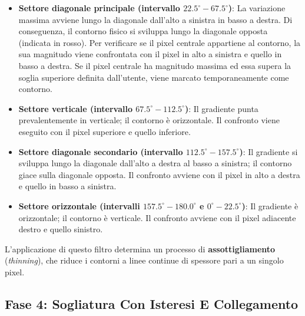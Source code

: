 ﻿\documentclass[11pt, a4paper]{article}
\begin{document}
\begin{itemize}
    \item \textbf{Settore diagonale principale (intervallo $22.5^\circ - 67.5^\circ$)}: La variazione massima avviene lungo la diagonale dall'alto a sinistra in basso a destra. Di conseguenza, il contorno fisico si sviluppa lungo la diagonale opposta (indicata in rosso). Per verificare se il pixel centrale appartiene al contorno, la sua magnitudo viene confrontata con il pixel in alto a sinistra e quello in basso a destra. Se il pixel centrale ha magnitudo massima ed essa supera la soglia superiore definita dall'utente, viene marcato temporaneamente come contorno.


    \item \textbf{Settore verticale (intervallo $67.5^\circ - 112.5^\circ$)}: Il gradiente punta prevalentemente in verticale; il contorno è orizzontale. Il confronto viene eseguito con il pixel superiore e quello inferiore.
    \item \textbf{Settore diagonale secondario (intervallo $112.5^\circ - 157.5^\circ$)}: Il gradiente si sviluppa lungo la diagonale dall'alto a destra al basso a sinistra; il contorno giace sulla diagonale opposta. Il confronto avviene con il pixel in alto a destra e quello in basso a sinistra.
    \item \textbf{Settore orizzontale (intervalli $157.5^\circ - 180.0^\circ$ e $0^\circ - 22.5^\circ$)}: Il gradiente è orizzontale; il contorno è verticale. Il confronto avviene con il pixel adiacente destro e quello sinistro.
\end{itemize}

L'applicazione di questo filtro determina un processo di \textbf{assottigliamento} (\emph{thinning}), che riduce i contorni a linee continue di spessore pari a un singolo pixel.



\subsection{Fase 4: Sogliatura Con Isteresi E Collegamento}
\end{document}
